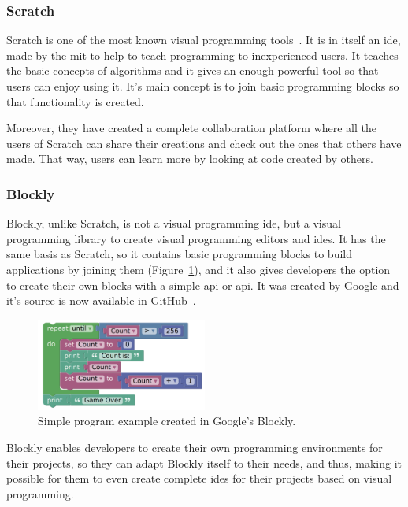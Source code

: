 \subsubsection{Scratch}

Scratch is one of the most known visual programming tools~\cite{scratch}. It is in itself an
\acrshort{ide}, made by the \acrshort{mit} to help to teach programming to inexperienced users. It
teaches the basic concepts of algorithms and it gives an enough powerful tool so that users can
enjoy using it. It's main concept is to join basic programming blocks so that functionality is
created.

Moreover, they have created a complete collaboration platform where all the users of Scratch can
share their creations and check out the ones that others have made. That way, users can learn more
by looking at code created by others.

\subsubsection{Blockly}

Blockly, unlike Scratch, is not a visual programming \acrshort{ide}, but a visual programming
library to create visual programming editors and \acrshort{ide}s. It has the same basis as Scratch,
so it contains basic programming blocks to build applications by joining them
(Figure~\ref{fig:blockly}), and it also gives developers the option to create their own blocks with
a simple \acrlong{api} or \acrshort{api}. It was created by Google and it's source is now available
in GitHub~\cite{blockly}.

\begin{figure}[ht]
	\centering
	\includegraphics[width=0.5\textwidth]{fig/blockly}
	\caption{Simple program example created in Google's Blockly.}\label{fig:blockly}
\end{figure}

Blockly enables developers to create their own programming environments for their projects, so they
can adapt Blockly itself to their needs, and thus, making it possible for them to even create
complete \acrshort{ide}s for their projects based on visual programming.

